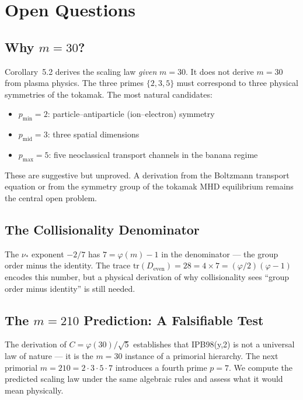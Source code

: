 \documentclass[11pt,letterpaper]{article}
\theoremstyle{definition}
\begin{document}
\section{Open Questions}

\subsection{Why $m = 30$?}

Corollary~5.2 derives the scaling law \emph{given} $m = 30$. It does not derive $m = 30$ from plasma physics. The three primes $\{2, 3, 5\}$ must correspond to three physical symmetries of the tokamak. The most natural candidates:
\begin{itemize}[nosep]
\item $p_{\text{min}} = 2$: particle--antiparticle (ion--electron) symmetry
\item $p_{\text{mid}} = 3$: three spatial dimensions
\item $p_{\text{max}} = 5$: five neoclassical transport channels in the banana regime
\end{itemize}
These are suggestive but unproved. A derivation from the Boltzmann transport equation or from the symmetry group of the tokamak MHD equilibrium remains the central open problem.

\subsection{The Collisionality Denominator}

The $\nu_*$ exponent $-2/7$ has $7 = \varphi(m) - 1$ in the denominator --- the group order minus the identity. The trace $\text{tr}(D_{\text{even}}) = 28 = 4 \times 7 = (\varphi/2)(\varphi - 1)$ encodes this number, but a physical derivation of why collisionality sees ``group order minus identity'' is still needed.

\subsection{The $m = 210$ Prediction: A Falsifiable Test}

The derivation of $C = \varphi(30)/\sqrt{5}$ establishes that IPB98(y,2) is not a universal law of nature --- it is the $m = 30$ instance of a primorial hierarchy. The next primorial $m = 210 = 2 \cdot 3 \cdot 5 \cdot 7$ introduces a fourth prime $p = 7$. We compute the predicted scaling law under the same algebraic rules and assess what it would mean physically.
\end{document}
